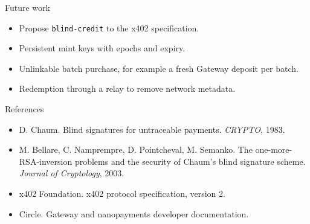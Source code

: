 \documentclass[aspectratio=169,11pt]{beamer}
\begin{document}
\begin{frame}{Future work}
  \begin{itemize}
    \item Propose \texttt{blind-credit} to the x402 specification.
    \item Persistent mint keys with epochs and expiry.
    \item Unlinkable batch purchase, for example a fresh Gateway deposit per batch.
    \item Redemption through a relay to remove network metadata.
  \end{itemize}
\end{frame}

\begin{frame}{References}
  \small
  \begin{itemize}
    \item D. Chaum. Blind signatures for untraceable payments. \emph{CRYPTO}, 1983.
    \item M. Bellare, C. Namprempre, D. Pointcheval, M. Semanko. The one-more-RSA-inversion problems and the security of Chaum's blind signature scheme. \emph{Journal of Cryptology}, 2003.
    \item x402 Foundation. x402 protocol specification, version 2.
    \item Circle. Gateway and nanopayments developer documentation.
  \end{itemize}
\end{frame}
\end{document}
